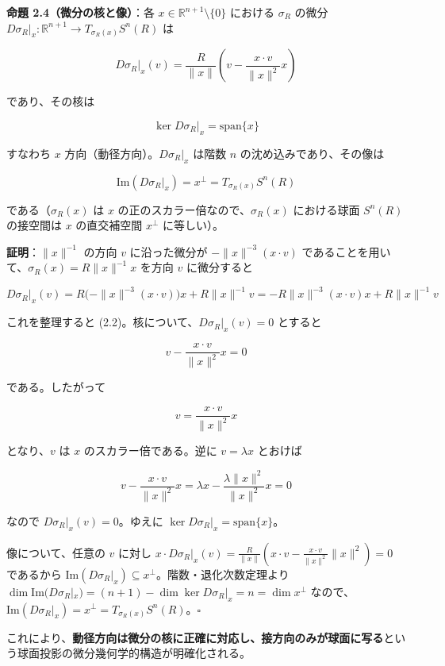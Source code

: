 \documentclass[
]{ltjsarticle}
\begin{document}
\textbf{命題 2.4（微分の核と像）}：各
\(x \in \mathbb{R}^{n+1} \setminus \{0\}\) における \(\sigma_R\) の微分
\(D\sigma_R|_x: \mathbb{R}^{n+1} \to T_{\sigma_R(x)} S^n(R)\) は

\[D\sigma_R|_x (v) = \frac{R}{\|x\|}\left(v - \frac{x \cdot v}{\|x\|^2} x\right) \tag{2.2}\]

であり、その核は

\[\ker D\sigma_R|_x = \mathrm{span}\{x\} \tag{2.3}\]

すなわち \(x\) 方向（動径方向）。\(D\sigma_R|_x\) は階数 \(n\)
の沈め込みであり、その像は

\[\mathrm{Im}(D\sigma_R|_x) = x^\perp = T_{\sigma_R(x)} S^n(R) \tag{2.4}\]

である（\(\sigma_R(x)\) は \(x\) の正のスカラー倍なので、\(\sigma_R(x)\)
における球面 \(S^n(R)\) の接空間は \(x\) の直交補空間 \(x^\perp\)
に等しい）。

\textbf{証明}：\(\|x\|^{-1}\) の方向 \(v\) に沿った微分が
\(-\|x\|^{-3}(x \cdot v)\)
であることを用いて、\(\sigma_R(x) = R \|x\|^{-1} x\) を方向 \(v\)
に微分すると

\[D\sigma_R|_x(v) = R \big(-\|x\|^{-3} (x \cdot v)\big) x + R \|x\|^{-1} v = -R \|x\|^{-3} (x \cdot v) x + R \|x\|^{-1} v\]

これを整理すると (2.2)。核について、\(D\sigma_R|_x(v) = 0\) とすると

\[v - \frac{x \cdot v}{\|x\|^2} x = 0\]

である。したがって

\[v = \frac{x \cdot v}{\|x\|^2} x\]

となり、\(v\) は \(x\) のスカラー倍である。逆に \(v = \lambda x\)
とおけば

\[v - \frac{x \cdot v}{\|x\|^2} x = \lambda x - \frac{\lambda \|x\|^2}{\|x\|^2} x = 0\]

なので \(D\sigma_R|_x(v) = 0\)。ゆえに
\(\ker D\sigma_R|_x = \mathrm{span}\{x\}\)。

像について、任意の \(v\) に対し
\(x \cdot D\sigma_R|_x(v) = \frac{R}{\|x\|}\left(x \cdot v - \frac{x \cdot v}{\|x\|^2}\|x\|^2\right) = 0\)
であるから
\(\mathrm{Im}(D\sigma_R|_x) \subseteq x^\perp\)。階数・退化次数定理より
\(\dim \mathrm{Im}(D\sigma_R|_x) = (n+1) - \dim \ker D\sigma_R|_x = n = \dim x^\perp\)
なので、\(\mathrm{Im}(D\sigma_R|_x) = x^\perp = T_{\sigma_R(x)} S^n(R)\)。\(\square\)

これにより、\textbf{動径方向は微分の核に正確に対応し、接方向のみが球面に写る}という球面投影の微分幾何学的構造が明確化される。
\end{document}
